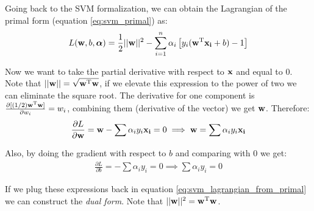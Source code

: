 Going back to the SVM formalization, we can obtain the Lagrangian of the primal form (equation \ref{eq:svm_primal}) as:
\begin{align}\label{eq:svm_lagrangian_from_primal}
    L(\mathbf{w}, b, \boldsymbol{\alpha}) = \frac{1}{2} ||\mathbf{w}||^2 - \sum_{i=1}^n \alpha_i \left[ y_i (\mathbf{w}^{\text{T}} \mathbf{x_i} + b) - 1\right]
\end{align}

Now we want to take the partial derivative with respect to $\mathbf{x}$ and equal to 0. Note that $||\mathbf{w}|| = \sqrt{\mathbf{w}^{\text{T}}\mathbf{w}}$, if we elevate this expression to the power of two we can eliminate the square root. The derivative for one component is $\frac{\partial [(1/2)\mathbf{w}^{\text{T}}\mathbf{w}]}{\partial w_i} = w_i$, combining them (derivative of the vector) we get $\mathbf{w}$. Therefore:
\begin{align}\label{eq:svm_representer}
    \frac{\partial L}{\partial \mathbf{w}} = \mathbf{w} - \sum \alpha_i y_i \mathbf{x_i} = 0 \implies \mathbf{w} = \sum \alpha_i y_i \mathbf{x_i}
\end{align}

Also, by doing the gradient with respect to $b$ and comparing with 0 we get:
\begin{align}
    \frac{\partial L}{\partial b} = - \sum \alpha_i y_i = 0 \implies \sum \alpha_i y_i = 0
\end{align}
 
If we plug these expressions back in equation \ref{eq:svm_lagrangian_from_primal} we can construct the \emph{dual form}. Note that $     ||\mathbf{w}||^2 = \mathbf{w}^{\text{T}} \mathbf{w}$.

